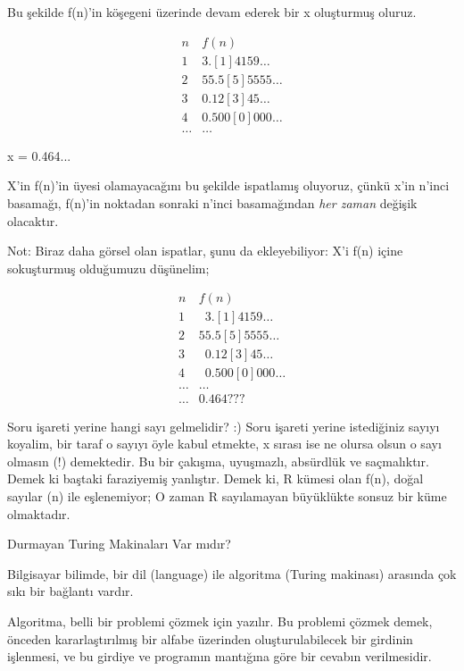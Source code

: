 \documentclass[12pt,fleqn]{article}\usepackage{../../common}
\begin{document}
Bu şekilde f(n)'in köşegeni üzerinde devam ederek bir x oluşturmuş oluruz.

$$
\begin{array}{cc}
n & f(n) \\
\hline
1 &  3.[1]4159 \dots \\
\hline
2 &  55.5[5]5555 \dots \\
\hline
3 &  0.12[3]45 \dots \\
\hline
4 &   0.500[0]000 \dots \\
\hline
\dots & \dots
\end{array}
$$

x = 0.464...

X'in f(n)'in üyesi olamayacağını bu şekilde ispatlamış oluyoruz, çünkü x'in
n'inci basamağı, f(n)'in noktadan sonraki n'inci basamağından {\em her zaman}
değişik olacaktır.

Not: Biraz daha görsel olan ispatlar, şunu da ekleyebiliyor: X'i f(n) içine
sokuşturmuş olduğumuzu düşünelim;


$$
\begin{array}{cc}
n & f(n) \\
\hline
1 & \enspace 3. [1]4159 \dots \\
\hline
2 & 55.5[5]5555 \dots \\
\hline
3 & \enspace 0.12[3]45 \dots \\
\hline
4 & \enspace 0.500[0]000 \dots \\
\hline
\dots & \dots  \\
\hline
\dots & 0.464 ???
\end{array}
$$

Soru işareti yerine hangi sayı gelmelidir? :) Soru işareti yerine
istediğiniz sayıyı koyalim, bir taraf o sayıyı öyle kabul etmekte, x sırası
ise ne olursa olsun o sayı olmasın (!)  demektedir. Bu bir çakışma,
uyuşmazlı, absürdlük ve saçmalıktır. Demek ki baştaki faraziyemiş
yanlıştır. Demek ki, R kümesi olan f(n), doğal sayılar (n) ile eşlenemiyor;
O zaman R sayılamayan büyüklükte sonsuz bir küme olmaktadır.

Durmayan Turing Makinaları Var mıdır?

Bilgisayar bilimde, bir dil (language) ile algoritma (Turing makinası) arasında
çok sıkı bir bağlantı vardır.

Algoritma, belli bir problemi çözmek için yazılır. Bu problemi çözmek
demek, önceden kararlaştırılmış bir alfabe üzerinden oluşturulabilecek bir
girdinin işlenmesi, ve bu girdiye ve programın mantığına göre bir cevabın
verilmesidir.
\end{document}
